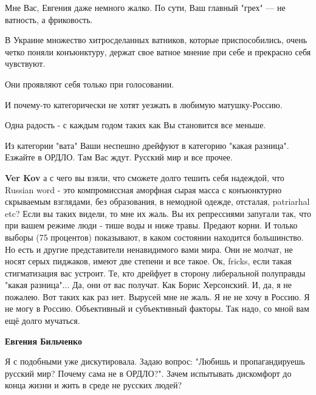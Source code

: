 \begin{itemize}
Мне Вас, Евгения даже немного жалко. По сути, Ваш главный "грех" — не ватность,
а фриковость.

В Украине множество хитросделанных ватников, которые приспособились, очень
четко поняли конъюнктуру, держат свое ватное мнение при себе и прекрасно себя
чувствуют.

Они проявляют себя только при голосовании.

И почему-то категорически не хотят уезжать в любимую матушку-Россию.

Одна радость - с каждым годом таких как Вы становится все меньше.

Из категории "вата" Ваши неспешно дрейфуют в категорию "какая разница". Езжайте
в ОРДЛО. Там Вас ждут. Русский мир и все прочее.

\begin{itemize}
 
\textbf{Ver Kov} а с чего вы взяли, что сможете долго тешить себя надеждой, что
Russian word - это компромиссная аморфная сырая масса с конъюнктурно скрываемым
взглядами, без образования, в немодной одежде, отсталая, patriarhal etc? Если
вы таких видели, то мне их жаль. Вы их репрессиями запугали так, что при вашем
режиме люди - тише воды и ниже травы. Предают корни. И только выборы (75
процентов) показывают, в каком состоянии находится большинство. Но есть и
другие представители ненавидимого вами мира. Они не молчат, не носят серых
пиджаков, имеют две степени и все такое. Ок, fricks, если такая стигматизация
вас устроит. Те, кто дрейфует в сторону либеральной полуправды "какая
разница"... Да, они от вас получат. Как Борис Херсонский. И, да, я не пожалею.
Вот таких как раз нет. Вырусей мне не жаль. Я не не хочу в Россию. Я не могу в
Россию. Объективный и субъективный факторы. Так надо, со мной вам ещё долго
мучаться.

 
\textbf{Евгения Бильченко} 

Я с подобными уже дискутировала. Задаю вопрос:
"Любишь и пропагандируешь русский мир? Почему сама не в ОРДЛО?". Зачем
испытывать дискомфорт до конца жизни и жить в среде не русских людей?


\end{itemize}
\end{itemize}
